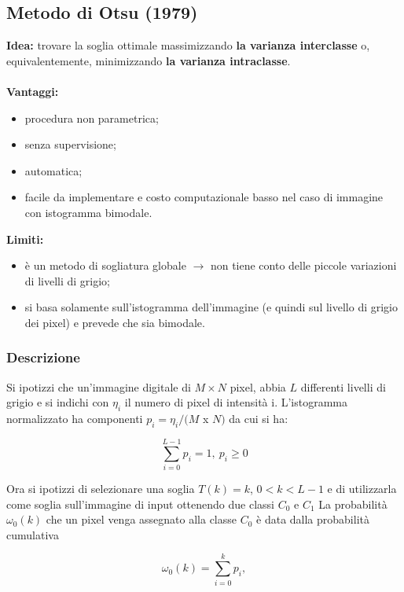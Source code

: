 \subsection{Metodo di Otsu (1979)}

\textbf{Idea:} trovare la soglia ottimale massimizzando \textbf{la varianza
    interclasse} o, equivalentemente, minimizzando \textbf{la varianza
    intraclasse}. \\\\\textbf{Vantaggi:}

\begin{itemize}
    \item procedura non parametrica;
    \item senza supervisione;
    \item automatica;
    \item facile da implementare e costo computazionale basso nel caso di
          immagine con istogramma bimodale.
\end{itemize}

\textbf{Limiti:}

\begin{itemize}
    \item è un metodo di sogliatura globale $\rightarrow$ non tiene conto delle
          piccole variazioni di livelli di grigio;
    \item si basa solamente sull'istogramma dell'immagine (e quindi sul livello
          di grigio dei pixel) e prevede che sia bimodale.
\end{itemize}

\subsubsection{Descrizione}

Si ipotizzi che un'immagine digitale di $M \times N$ pixel, abbia $L$ differenti
livelli di grigio e si indichi con $\eta_i$ il numero di pixel di intensità i.
L'istogramma normalizzato ha componenti $p_i = \eta_i/(M$ x $N)$ da cui si ha:

$$
    \sum_{i=0}^{L-1}p_i = 1, \ p_i \ge 0
$$

Ora si ipotizzi di selezionare una soglia $T(k) = k$, $0 < k < L - 1$ e di
utilizzarla come soglia sull'immagine di input ottenendo due classi $C_0$ e
$C_1$ La probabilità $\omega_0(k)$ che un pixel venga assegnato alla classe
$C_0$ è data dalla probabilità cumulativa

$$
    \omega_0(k) = \sum_{i=0}^{k}p_i,
$$

